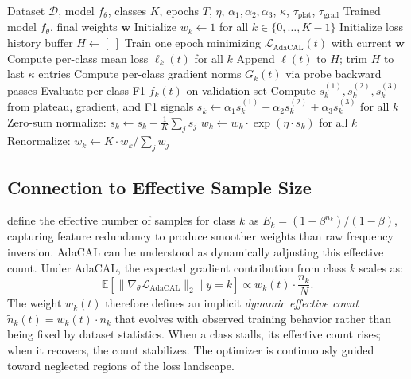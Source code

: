 \documentclass[letterpaper]{article}
\begin{document}
\begin{algorithm}[t]
\caption{AdaCAL Training}
\label{alg:adacal}
\begin{algorithmic}[1]
\REQUIRE Dataset $\mathcal{D}$, model $f_\theta$, classes $K$, epochs $T$, $\eta$, $\alpha_1, \alpha_2, \alpha_3$, $\kappa$, $\tau_\text{plat}$, $\tau_\text{grad}$
\ENSURE Trained model $f_\theta$, final weights $\mathbf{w}$
\STATE Initialize $w_k \leftarrow 1$ for all $k \in \{0,\ldots,K-1\}$
\STATE Initialize loss history buffer $H \leftarrow [\;]$
    \STATE Train one epoch minimizing $\mathcal{L}_\text{AdaCAL}(t)$ with current $\mathbf{w}$
    \STATE Compute per-class mean loss $\bar{\ell}_k(t)$ for all $k$
    \STATE Append $\bar{\ell}(t)$ to $H$; trim $H$ to last $\kappa$ entries
    \STATE Compute per-class gradient norms $G_k(t)$ via probe backward passes
    \STATE Evaluate per-class F1 $f_k(t)$ on validation set
    \STATE Compute $s^{(1)}_k, s^{(2)}_k, s^{(3)}_k$ from plateau, gradient, and F1 signals
    \STATE $s_k \leftarrow \alpha_1 s^{(1)}_k + \alpha_2 s^{(2)}_k + \alpha_3 s^{(3)}_k$ for all $k$
    \STATE Zero-sum normalize: $s_k \leftarrow s_k - \frac{1}{K}\sum_j s_j$
    \STATE $w_k \leftarrow w_k \cdot \exp(\eta \cdot s_k)$ for all $k$
    \STATE Renormalize: $w_k \leftarrow K \cdot w_k / \sum_j w_j$
\ENDFOR
\end{algorithmic}
\end{algorithm}

\subsection{Connection to Effective Sample Size}

\citet{cui2019class} define the effective number of samples for class $k$ as $E_k = (1 - \beta^{n_k}) / (1 - \beta)$, capturing feature redundancy to produce smoother weights than raw frequency inversion. AdaCAL can be understood as dynamically adjusting this effective count. Under AdaCAL, the expected gradient contribution from class $k$ scales as:
$$\mathbb{E}\!\left[\|\nabla_\theta \mathcal{L}_\text{AdaCAL}\|_2 \mid y = k\right] \propto w_k(t) \cdot \frac{n_k}{N}.$$
The weight $w_k(t)$ therefore defines an implicit \textit{dynamic effective count} $\tilde{n}_k(t) = w_k(t) \cdot n_k$ that evolves with observed training behavior rather than being fixed by dataset statistics. When a class stalls, its effective count rises; when it recovers, the count stabilizes. The optimizer is continuously guided toward neglected regions of the loss landscape.
\end{document}
